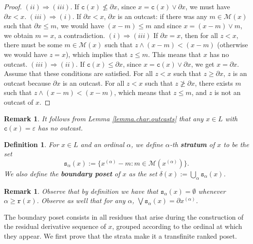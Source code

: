 \documentclass{article}
\newtheorem{definition}[theorem]{Definition}
\newtheorem{remark}[theorem]{Remark}
\begin{document}
\begin{proof}
    $(ii) \Rightarrow (iii)$. If $\texttt{c}(x) \not \le \partial x$, since $x = \texttt{c}(x) \vee \partial x$, we must have $\partial x < x$. 
    $(iii) \Rightarrow (i)$. If $\partial x < x$, $\partial x$ is an outcast: if there was any $m \in \mathcal{M}(x)$ such that $\partial x \le m$, we would have $(x-m) \le m$  {and since $x=(x-m)\vee m$, we obtain $m = x$, a contradiction.}
    $(i) \Rightarrow (iii)$ If $\partial x = x$, then for all $z < x$, 
    there must be some $m \in \mathcal{M}(x)$ such that $z \wedge (x-m) < (x-m)$ (otherwise we would have $z = x$), which implies that $z \le m$. This means that $x$ has no outcast. $(iii) \Rightarrow (ii)$. If $\texttt{c}(x) \le \partial x$, since $x =\texttt{c}(x) \vee \partial x$, we get $x = \partial x$.  
    Assume that these conditions are satisfied. For all $z < x$ such that 
    $z \ge \partial x$, $z$ is an outcast because $\partial x$ is an outcast. For all $z < x$ such that $z \not \ge \partial x$, there exists $m$ such that $z \wedge (x-m) < (x-m)$, which means that $z \le m$, and $z$ is not an outcast of $x$.
\end{proof}

\begin{remark}
    It follows from Lemma \ref{lemma.char.outcasts} that any $x \in L$ with $\texttt{c}(x) = \varepsilon$ has no outcast.
\end{remark}


\begin{definition}
    For $x \in L$  and an ordinal $\alpha$, we define $\alpha$-th \textbf{stratum} of $x$ to be the set
    \[\texttt{s}_{\alpha}(x) := \{x^{(\alpha)} - m : m \in \mathcal{M}(x^{(\alpha)})\}.\]
    We also define the \textbf{boundary poset} of $x$ as the set $\delta(x) := \bigcup_{\alpha} \texttt{s}_{\alpha}(x)$.
\end{definition}


\begin{remark}
     Observe that by definition we have that $\texttt{s}_{\alpha}(x) = \emptyset$ whenever $\alpha \geq \texttt{r}(x)$. Observe as well that for any $\alpha$, $\bigvee \texttt{s}_{\alpha}(x) = \partial x^{(\alpha)}$.
\end{remark}

{
The boundary poset consists in all residues that arise during the construction of the residual derivative sequence of \(x\), grouped according to the ordinal at which they appear. We first prove that the strata make it a transfinite ranked poset.}
\end{document}
